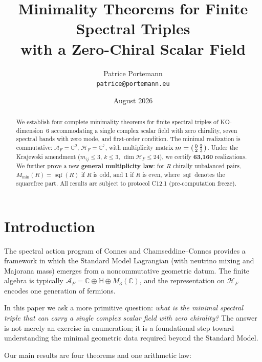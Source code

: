 \documentclass[11pt,a4paper]{article}
\title{Minimality Theorems for Finite Spectral Triples\\with a Zero-Chiral Scalar Field}
\author{Patrice Portemann\\\texttt{patrice@portemann.eu}}
\date{August 2026}
\theoremstyle{definition}
\begin{document}
\maketitle

\begin{abstract}
We establish four complete minimality theorems for finite spectral triples of KO-dimension~6 accommodating a single complex scalar field with zero chirality, seven spectral bands with zero mode, and first-order condition. The minimal realization is commutative: $\mathcal{A}_F = \mathbb{C}^2$, $\mathcal{H}_F = \mathbb{C}^7$, with multiplicity matrix $m = \begin{psmallmatrix} 0 & 2 \\ 2 & 3 \end{psmallmatrix}$. Under the Krajewski amendment ($m_{ij} \leq 3$, $k \leq 3$, $\dim \mathcal{H}_F \leq 24$), we certify \textbf{63,160} realizations. We further prove a new \textbf{general multiplicity law}: for $R$ chirally unbalanced pairs, $M_{\min}(R) = \operatorname{sqf}(R)$ if $R$ is odd, and $1$ if $R$ is even, where $\operatorname{sqf}$ denotes the squarefree part. All results are subject to protocol C12.1 (pre-computation freeze).
\end{abstract}

\tableofcontents
\newpage

\section{Introduction}

The spectral action program of Connes and Chamseddine--Connes \cite{connes1994,cc1997} provides a framework in which the Standard Model Lagrangian (with neutrino mixing and Majorana mass) emerges from a noncommutative geometric datum. The finite algebra is typically $\mathcal{A}_F = \mathbb{C} \oplus \mathbb{H} \oplus M_3(\mathbb{C})$, and the representation on $\mathcal{H}_F$ encodes one generation of fermions.

In this paper we ask a more primitive question: \textit{what is the minimal spectral triple that can carry a single complex scalar field with zero chirality?} The answer is not merely an exercise in enumeration; it is a foundational step toward understanding the minimal geometric data required beyond the Standard Model.

Our main results are four theorems and one arithmetic law:
\end{document}
